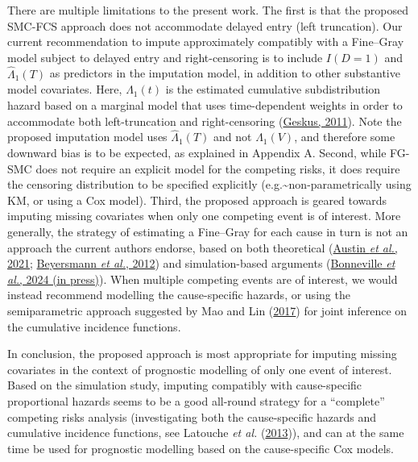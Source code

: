 \documentclass[
  letterpaper,
  DIV=11,
  numbers=noendperiod]{scrreprt}
\begin{document}
There are multiple limitations to the present work. The first is that
the proposed SMC-FCS approach does not accommodate delayed entry (left
truncation). Our current recommendation to impute approximately
compatibly with a Fine--Gray model subject to delayed entry and
right-censoring is to include \(I(D=1)\) and \(\hat{\Lambda}_1(T)\) as
predictors in the imputation model, in addition to other substantive
model covariates. Here, \(\hat{\Lambda}_1(t)\) is the estimated
cumulative subdistribution hazard based on a marginal model that uses
time-dependent weights in order to accommodate both left-truncation and
right-censoring
(\protect\hyperlink{ref-geskusCauseSpecificCumulativeIncidence2011}{Geskus,
2011}). Note the proposed imputation model uses \(\hat{\Lambda}_1(T)\)
and not \(\hat{\Lambda}_1(V)\), and therefore some downward bias is to
be expected, as explained in Appendix A. Second, while FG-SMC does not
require an explicit model for the competing risks, it does require the
censoring distribution to be specified explicitly
(e.g.\textasciitilde non-parametrically using KM, or using a Cox model).
Third, the proposed approach is geared towards imputing missing
covariates when only one competing event is of interest. More generally,
the strategy of estimating a Fine--Gray for each cause in turn is not an
approach the current authors endorse, based on both theoretical
(\protect\hyperlink{ref-austinFineGraySubdistributionHazard2021}{Austin
\emph{et al.}, 2021};
\protect\hyperlink{ref-beyersmannCompetingRisksMultistate2012}{Beyersmann
\emph{et al.}, 2012}) and simulation-based arguments
(\protect\hyperlink{ref-bonnevilleWhyYouShould2024}{Bonneville \emph{et
al.}, 2024 (in press)}). When multiple competing events are of interest,
we would instead recommend modelling the cause-specific hazards, or
using the semiparametric approach suggested by Mao and Lin
(\protect\hyperlink{ref-maoEfficientEstimationSemiparametric2017}{2017})
for joint inference on the cumulative incidence functions.

In conclusion, the proposed approach is most appropriate for imputing
missing covariates in the context of prognostic modelling of only one
event of interest. Based on the simulation study, imputing compatibly
with cause-specific proportional hazards seems to be a good all-round
strategy for a ``complete'' competing risks analysis (investigating both
the cause-specific hazards and cumulative incidence functions, see
Latouche \emph{et al.}
(\protect\hyperlink{ref-latoucheCompetingRisksAnalysis2013}{2013})), and
can at the same time be used for prognostic modelling based on the
cause-specific Cox models.
\end{document}
